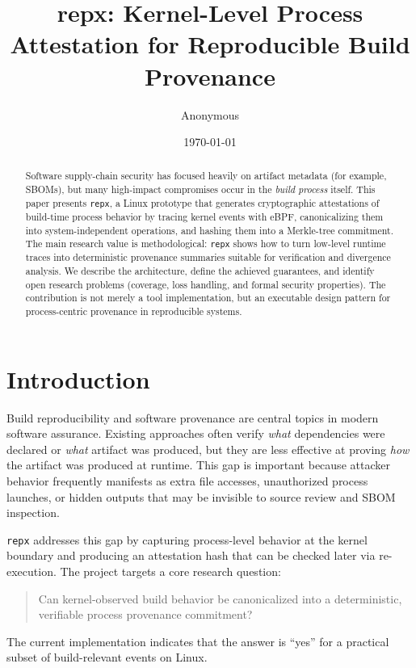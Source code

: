 \documentclass[11pt]{article}
\title{repx: Kernel-Level Process Attestation for Reproducible Build Provenance}
\author{Anonymous}
\date{\today}
\begin{document}
\maketitle

\begin{abstract}
Software supply-chain security has focused heavily on artifact metadata (for example, SBOMs), but many high-impact compromises occur in the \emph{build process} itself. This paper presents \texttt{repx}, a Linux prototype that generates cryptographic attestations of build-time process behavior by tracing kernel events with eBPF, canonicalizing them into system-independent operations, and hashing them into a Merkle-tree commitment. The main research value is methodological: \texttt{repx} shows how to turn low-level runtime traces into deterministic provenance summaries suitable for verification and divergence analysis. We describe the architecture, define the achieved guarantees, and identify open research problems (coverage, loss handling, and formal security properties). The contribution is not merely a tool implementation, but an executable design pattern for process-centric provenance in reproducible systems.
\end{abstract}

\section{Introduction}
Build reproducibility and software provenance are central topics in modern software assurance. Existing approaches often verify \emph{what} dependencies were declared or \emph{what} artifact was produced, but they are less effective at proving \emph{how} the artifact was produced at runtime. This gap is important because attacker behavior frequently manifests as extra file accesses, unauthorized process launches, or hidden outputs that may be invisible to source review and SBOM inspection.

\texttt{repx} addresses this gap by capturing process-level behavior at the kernel boundary and producing an attestation hash that can be checked later via re-execution. The project targets a core research question:
\begin{quote}
Can kernel-observed build behavior be canonicalized into a deterministic, verifiable process provenance commitment?
\end{quote}

The current implementation indicates that the answer is ``yes'' for a practical subset of build-relevant events on Linux.
\end{document}
